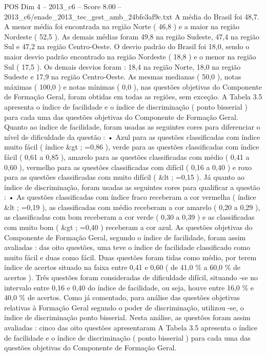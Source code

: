 \begin{textsample}{POS Dim 4 – 2013\_c6 – Score 8.00 – 2013\_c6/enade\_2013\_tec\_gest\_amb\_24bfe3af9c.txt}
A média do Brasil foi 48,7.
A menor média foi encontrada na região Norte ( 46,8 ) e a maior na região Nordeste ( 52,5 ).
As demais médias foram 49,8 na região Sudeste, 47,4 na região Sul e 47,2 na região Centro-Oeste.
O desvio padrão do Brasil foi 18,0, sendo o maior desvio padrão encontrado na região Nordeste ( 18,8 ) e o menor na região Sul ( 17,5 ).
Os demais desvios foram : 18,4 na região Norte, 18,0 na região Sudeste e 17,9 na região Centro-Oeste.
As mesmas medianas ( 50,0 ), notas máximas ( 100,0 ) e notas mínimas ( 0,0 ), nas questões objetivas do Componente de Formação Geral, foram obtidas em todas as regiões, sem exceção.
A Tabela 3.5 apresenta o índice de facilidade e o índice de discriminação ( ponto bisserial ) para cada uma das questões objetivas do Componente de Formação Geral.
Quanto ao índice de facilidade, foram usadas as seguintes cores para diferenciar o nível de dificuldade da questão : • Azul para as questões classificadas com índice muito fácil ( índice \&gt ; =0,86 ), verde para as questões classificadas com índice fácil ( 0,61 a 0,85 ), amarelo para as questões classificadas com médio ( 0,41 a 0,60 ), vermelho para as questões classificadas com difícil ( 0,16 a 0,40 ) e roxo para as questões classificadas com muito difícil ( \&lt ; =0,15 ).
Já quanto ao índice de discriminação, foram usadas as seguintes cores para qualificar a questão : • As questões classificadas com índice fraco receberam a cor vermelha ( índice \&lt ; =0,19 ), as classificadas com médio receberam a cor amarelo ( 0,20 a 0,29 ), as classificadas com bom receberam a cor verde ( 0,30 a 0,39 ) e as classificadas com muito bom ( \&gt ; =0,40 ) receberam a cor azul.
As questões objetivas do Componente de Formação Geral, segundo o índice de facilidade, foram assim avaliadas : das oito questões, uma teve o índice de facilidade classificado como muito fácil e duas como fácil.
Duas questões foram tidas como médio, por terem índice de acertos situado na faixa entre 0,41 e 0,60 ( de 41,0 \% a 60,0 \% de acertos ).
Três questões foram consideradas de dificuldade difícil, situando -se no intervalo entre 0,16 e 0,40 do índice de facilidade, ou seja, houve entre 16,0 \% e 40,0 \% de acertos.
Como já comentado, para análise das questões objetivas relativas à Formação Geral segundo o poder de discriminação, utilizou -se, o índice de discriminação ponto bisserial.
Nesta análise, as questões foram assim avaliadas : cinco das oito questões apresentaram A Tabela 3.5 apresenta o índice de facilidade e o índice de discriminação ( ponto bisserial ) para cada uma das questões objetivas do Componente de Formação Geral.

\end{textsample}
